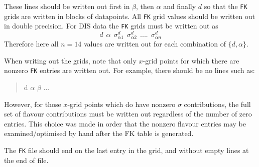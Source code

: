\documentclass[11pt]{article}
\newcommand{\be}{\begin{equation}}
\newcommand{\ee}{\end{equation}}
\begin{document}
These lines should be written out first in $\beta$, then $\alpha$ and finally
$d$ so that the {\tt FK} grids are written in blocks of datapoints. All {\tt FK}
grid values should be written out in double precision. For DIS data the {\tt FK}
grids must be written out as
%
\be d \:\: \alpha \:\: \sigma^d_{\alpha 1} \:\: \sigma^d_{\alpha 2}\:\: ....\:\: \sigma^d_{\alpha n} \ee
%
Therefore here all $n=14$ values are written out for each combination of $\{d,\alpha\}$.

When writing out the grids, note that only $x$-grid points for which there are
nonzero {\tt FK} entries are written out. For example, there should be no lines
such as:
%
\begin{quotation} d \:\: $\alpha$ \:\: $\beta$ \: \:      \:    \:\:  ... \:  \end{quotation}
%
However, for those $x$-grid points which do have nonzero $\sigma$ contributions,
the full set of flavour contributions must be written out regardless of the
number of zero entries. This choice was made in order that the nonzero flavour
entries may be examined/optimised by hand after the FK table is generated.

The {\tt FK} file should end on the last entry in the grid, and without empty
lines at the end of file.
\end{document}
